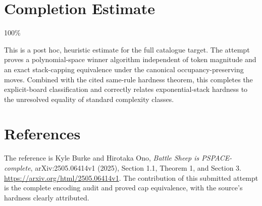 \documentclass[11pt]{article}
\begin{document}
\section{Completion Estimate}
100\%

This is a post hoc, heuristic estimate for the full catalogue target.
The attempt proves a polynomial-space winner algorithm independent of token magnitude and an exact stack-capping equivalence under the canonical occupancy-preserving moves. Combined with the cited same-rule hardness theorem, this completes the explicit-board classification and correctly relates exponential-stack hardness to the unresolved equality of standard complexity classes.

\section*{References}
The reference is Kyle Burke and Hirotaka Ono,
\emph{Battle Sheep is PSPACE-complete}, arXiv:2505.06414v1 (2025),
Section 1.1, Theorem 1, and Section 3.
\url{https://arxiv.org/html/2505.06414v1}.
The contribution of this submitted attempt is the complete encoding audit
and proved cap equivalence, with the source's hardness clearly attributed.
\end{document}
